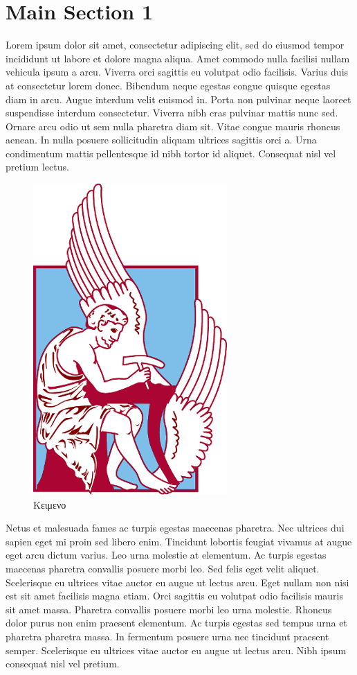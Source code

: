 \section{Main Section 1}
Lorem ipsum dolor sit amet, consectetur adipiscing elit, sed do eiusmod tempor incididunt ut labore et dolore magna aliqua. Amet commodo nulla facilisi nullam vehicula ipsum a arcu. Viverra orci sagittis eu volutpat odio facilisis. Varius duis at consectetur lorem donec. Bibendum neque egestas congue quisque egestas diam in arcu. Augue interdum velit euismod in. Porta non pulvinar neque laoreet suspendisse interdum consectetur. Viverra nibh cras pulvinar mattis nunc sed. Ornare arcu odio ut sem nulla pharetra diam sit. Vitae congue mauris rhoncus aenean. In nulla posuere sollicitudin aliquam ultrices sagittis orci a. Urna condimentum mattis pellentesque id nibh tortor id aliquet. Consequat nisl vel pretium lectus.

\begin{figure}[H]
	\centering
	\includegraphics[width=0.4\columnwidth]{Images/university}
	\caption{Κειμενο}
\end{figure}

Netus et malesuada fames ac turpis egestas maecenas pharetra. Nec ultrices dui sapien eget mi proin sed libero enim. Tincidunt lobortis feugiat vivamus at augue eget arcu dictum varius. Leo urna molestie at elementum. Ac turpis egestas maecenas pharetra convallis posuere morbi leo. Sed felis eget velit aliquet. Scelerisque eu ultrices vitae auctor eu augue ut lectus arcu. Eget nullam non nisi est sit amet facilisis magna etiam. Orci sagittis eu volutpat odio facilisis mauris sit amet massa. Pharetra convallis posuere morbi leo urna molestie. Rhoncus dolor purus non enim praesent elementum. Ac turpis egestas sed tempus urna et pharetra pharetra massa. In fermentum posuere urna nec tincidunt praesent semper. Scelerisque eu ultrices vitae auctor eu augue ut lectus arcu. Nibh ipsum consequat nisl vel pretium.


